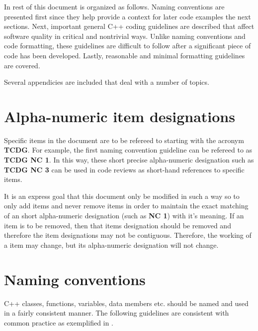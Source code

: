 In rest of this document is organized as follows.  Naming conventions are
presented first since they help provide a context for later code examples the
next sections.  Next, important general C++ coding guidelines are described
that affect software quality in critical and nontrivial ways.  Unlike naming
conventions and code formatting, these guidelines are difficult to follow
after a significant piece of code has been developed.  Lastly, reasonable and
minimal formatting guidelines are covered.

Several appendicies are included that deal with a number of topics.

%
\section{Alpha-numeric item designations}
%

Specific items in the document are to be refereed to starting with the acronym
{}\textbf{TCDG}.  For example, the first naming convention guideline can be
refereed to as {}\textbf{TCDG NC 1}.  In this way, these short precise
alpha-numeric designation such as {}\textbf{TCDG NC 3} can be used in code
reviews as short-hand references to specific items.

It is an express goal that this document only be modified in such a way so to
only add items and never remove items in order to maintain the exact matching
of an short alpha-numeric designation (such as {}\textbf{NC 1}) with it's
meaning.  If an item is to be removed, then that items designation should be
removed and therefore the item designations may not be contiguous.  Therefore,
the working of a item may change, but its alpha-numeric designation will not
change.

%
\section{Naming conventions}
%

C++ classes, functions, variables, data members etc. should be named and used
in a fairly consistent manner.  The following guidelines are consistent with
common practice as exemplified in {}\cite{EffectiveC++3rd05}.

